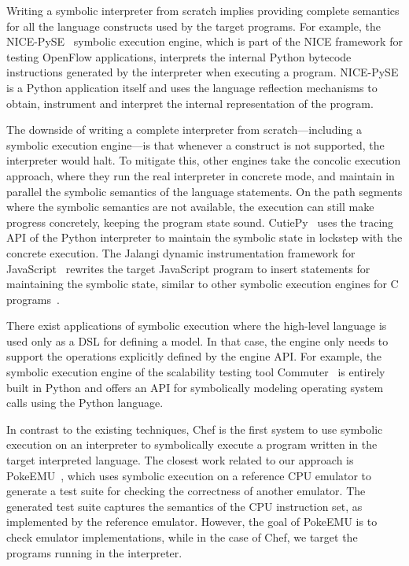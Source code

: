 Writing a symbolic interpreter from scratch implies providing complete semantics for all the language constructs used by the target programs.  For example, the NICE-PySE~\cite{nice} symbolic execution engine, which is part of the NICE framework for testing OpenFlow applications, interprets the internal Python bytecode instructions generated by the interpreter when executing a program.  NICE-PySE is a Python application itself and uses the language reflection mechanisms to obtain, instrument and interpret the internal representation of the program.

The downside of writing a complete interpreter from scratch---including a symbolic execution engine---is that whenever a construct is not supported, the interpreter would halt.  To mitigate this, other engines take the concolic execution approach, where they run the real interpreter in concrete mode, and maintain in parallel the symbolic semantics of the language statements.  On the path segments where the symbolic semantics are not available, the execution can still make progress concretely, keeping the program state sound.  CutiePy~\cite{cutie-py} uses the tracing API of the Python interpreter to maintain the symbolic state in lockstep with the concrete execution.  The Jalangi dynamic instrumentation framework for JavaScript~\cite{jalangi} rewrites the target JavaScript program to insert statements for maintaining the symbolic state, similar to other symbolic execution engines for C programs~\cite{dart,cute,exe}.

There exist applications of symbolic execution where the high-level language is used only as a DSL for defining a model.  In that case, the engine only needs to support the operations explicitly defined by the engine API.  For example, the symbolic execution engine of the scalability testing tool Commuter~\cite{commuter} is entirely built in Python and offers an API for symbolically modeling operating system calls using the Python language.

In contrast to the existing techniques, Chef is the first system to use symbolic execution on an interpreter to symbolically execute a program written in the target interpreted language.  The closest work related to our approach is PokeEMU~\cite{hifi-lofi}, which uses symbolic execution on a reference CPU emulator to generate a test suite for checking the correctness of another emulator.  The generated test suite captures the semantics of the CPU instruction set, as implemented by the reference emulator.  However, the goal of PokeEMU is to check emulator implementations, while in the case of Chef, we target the programs running in the interpreter.

